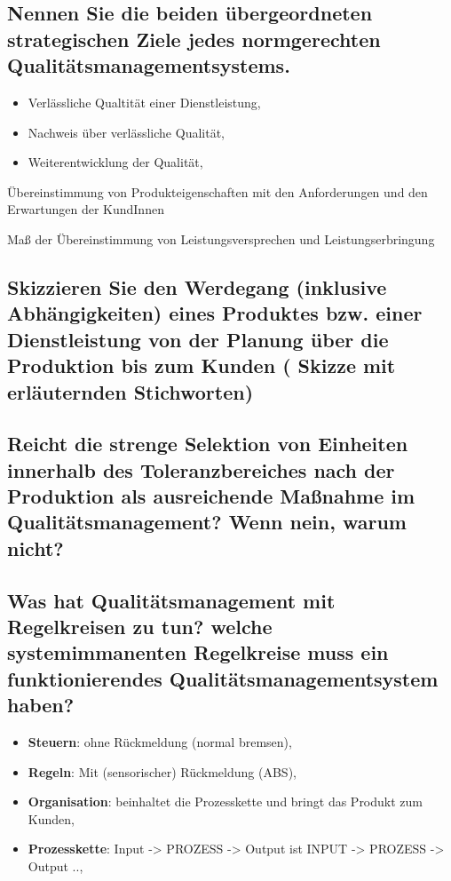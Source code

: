 	\subsection{Nennen Sie die beiden übergeordneten strategischen Ziele jedes normgerechten Qualitätsmanagementsystems.}
	
	\begin{itemize}
		\item Verlässliche Qualtität einer Dienstleistung,
		\item Nachweis über verlässliche Qualität,
		\item Weiterentwicklung der Qualität,
	\end{itemize}
	
	Übereinstimmung von Produkteigenschaften mit den Anforderungen und den Erwartungen der KundInnen
	
	Maß der	Übereinstimmung von Leistungsversprechen und Leistungserbringung	

	\subsection{Skizzieren Sie den Werdegang (inklusive Abhängigkeiten) eines Produktes bzw. einer Dienstleistung von der Planung über die Produktion bis zum Kunden ( Skizze mit erläuternden Stichworten) }

	\subsection{Reicht die strenge Selektion von Einheiten innerhalb des Toleranzbereiches nach der Produktion als ausreichende Maßnahme im Qualitätsmanagement? Wenn nein, warum nicht?}

	\subsection{Was hat Qualitätsmanagement mit Regelkreisen zu tun? welche systemimmanenten Regelkreise muss ein funktionierendes Qualitätsmanagementsystem haben?}
	
	\begin{itemize}
		\item \textbf{Steuern}: ohne Rückmeldung (normal bremsen),
		\item \textbf{Regeln}: Mit (sensorischer) Rückmeldung (ABS),
		\item \textbf{Organisation}: beinhaltet die Prozesskette und bringt das Produkt zum Kunden,
		\item \textbf{Prozesskette}: Input -> PROZESS -> Output ist INPUT -> PROZESS -> Output ..,
	\end{itemize}
	
